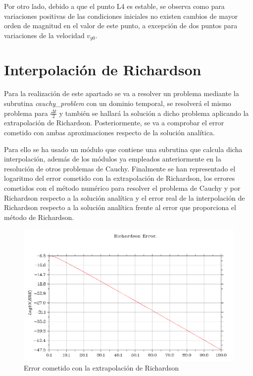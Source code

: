 \documentclass{article}
\begin{document}
	Por otro lado, debido a que el punto L4 es estable, se observa como para variaciones positivas de las condiciones iniciales no existen cambios de mayor orden de magnitud en el valor de este punto, a excepción de dos puntos para variaciones de la velocidad $v_{y0}$.
	
	\newpage
	
	\section{Interpolación de Richardson}
	
	Para la realización de este apartado se va a resolver un problema mediante la subrutina \textit{cauchy\_problem} con un dominio temporal, se resolverá el mismo problema para $\frac{\Delta t}{2}$ y también se hallará la solución a dicho problema aplicando la extrapolación de Richardson. Posteriormente, se va a comprobar el error cometido con ambas aproximaciones respecto de la solución analítica.
	
	Para ello se ha usado un módulo que contiene una subrutina que calcula dicha interpolación, además de los módulos ya empleados anteriormente en la resolución de otros problemas de Cauchy. Finalmente se han representado el logaritmo del error cometido con la extrapolación de Richardson, los errores cometidos con el método numérico para resolver el problema de Cauchy y por Richardson respecto a la solución analítica y el error real de la interpolación de Richardson respecto a la solución analítica frente al error que proporciona el método de Richardson.
	
	\begin{figure}[h!]
		\begin{center}
			\includegraphics[scale=0.4]{richardson1.png}
			\caption{Error cometido con la extrapolación de Richardson}
		\end{center}
	\end{figure}
\end{document}
